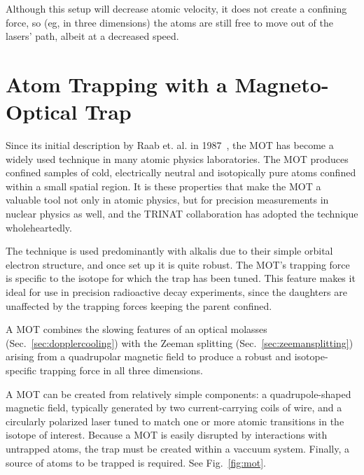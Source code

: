Although this setup will decrease atomic velocity, it does not create a confining force, so (eg, in three dimensions) the atoms are still free to move out of the lasers' path, albeit at a decreased speed.






\section{Atom Trapping with a Magneto-Optical Trap}
\label{section:mot}
Since its initial description by Raab et. al. in 1987~\cite{raabprentiss}, the \ac{MOT} has become a widely used technique in many atomic physics laboratories. The MOT produces confined samples of cold, electrically neutral and isotopically pure atoms confined within a small spatial region.  It is these properties that make the MOT a valuable tool not only in atomic physics, but for precision measurements in nuclear physics as well, and the \ac{TRINAT} collaboration has adopted the technique wholeheartedly.

The technique is used predominantly with alkalis due to their simple orbital electron structure, and once set up it is quite robust.  The MOT's trapping force is specific to the isotope for which the trap has been tuned. This feature makes it ideal for use in precision radioactive decay experiments, since the daughters are unaffected by the trapping forces keeping the parent confined.

A \ac{MOT} combines the slowing features of an optical molasses (Sec.~\ref{sec:dopplercooling}) with the Zeeman splitting (Sec.~\ref{sec:zeemansplitting}) arising from a quadrupolar magnetic field to produce a robust and isotope-specific trapping force in all three dimensions.  

A MOT can be created from relatively simple components:  a quadrupole-shaped magnetic field, typically generated by two current-carrying coils of wire, and a circularly polarized laser tuned to match one or more atomic transitions in the isotope of interest.  Because a MOT is easily disrupted by interactions with untrapped atoms, the trap must be created within a vaccuum system.  Finally, a source of atoms to be trapped is required.  See Fig.~\ref{fig:mot}.

